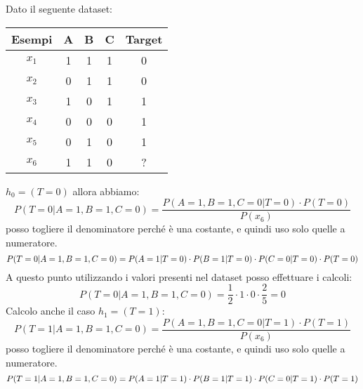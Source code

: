 \begin{esempio}
    Dato il seguente dataset:
    \begin{table}[!ht]
        \centering
        \begin{tabular}{c|ccc|c}
            Esempi & A & B & C & Target \\ \hline
            $x_1$  & 1 & 1 & 1 & 0      \\ \hline
            $x_2$  & 0 & 1 & 1 & 0      \\ \hline
            $x_3$  & 1 & 0 & 1 & 1      \\ \hline
            $x_4$  & 0 & 0 & 0 & 1      \\ \hline
            $x_5$  & 0 & 1 & 0 & 1      \\ \hline
            $x_6$  & 1 & 1 & 0 & ?      \\
        \end{tabular}
    \end{table}
    $h_0 = (T = 0)$ allora abbiamo:
    \begin{equation}
        P(T = 0 | A = 1, B = 1, C = 0) = \frac{P(A = 1, B = 1, C = 0 | T = 0)
            \cdot P(T = 0)}{P(x_6)}
    \end{equation}
    posso togliere il denominatore perché è una costante, e quindi uso solo
    quelle a numeratore.
    \begin{equation}
        P(T = 0 | A = 1, B = 1, C = 0) = \\ P(A = 1 | T = 0) \cdot P(B = 1 | T = 0)
        \cdot P(C = 0 | T = 0) \cdot P(T = 0)
    \end{equation}
    A questo punto utilizzando i valori presenti nel dataset posso effettuare i
    calcoli:
    \begin{equation}
        P(T = 0 | A = 1, B = 1, C = 0) = \frac{1}{2} \cdot 1 \cdot 0 \cdot \frac{2}{5} = 0
    \end{equation}
    Calcolo anche il caso $h_1 = (T = 1)$:
    \begin{equation}
        P(T = 1 | A = 1, B = 1, C = 0) = \frac{P(A = 1, B = 1, C = 0 | T = 1)
            \cdot P(T = 1)}{P(x_6)}
    \end{equation}
    posso togliere il denominatore perché è una costante, e quindi uso solo
    quelle a numeratore.
    \begin{equation}
        P(T = 1 | A = 1, B = 1, C = 0) = \\ P(A = 1 | T = 1) \cdot P(B = 1 | T = 1)
        \cdot P(C = 0 | T = 1) \cdot P(T = 1)
    \end{equation}

\end{esempio}
